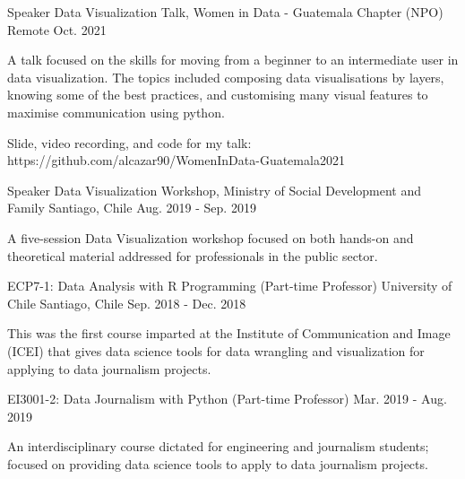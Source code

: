 

\begin{cventries}

  \cventry
    {Speaker} %
    {Data Visualization Talk, Women in Data - Guatemala Chapter (NPO)} %
    {Remote} %
    {Oct. 2021} %
    {
      \begin{cvitems} %
        \item {A talk focused on the skills for moving from a beginner to an intermediate user in data visualization. The topics included composing data visualisations by layers, knowing some of the best practices, and customising many visual features to maximise communication using python.}
        \item {Slide, video recording, and code for my talk: https://github.com/alcazar90/WomenInData-Guatemala2021}
      \end{cvitems}
    }
    
  \cventry
    {Speaker} %
    {Data Visualization Workshop, Ministry of Social Development and Family} %
    {Santiago, Chile} %
    {Aug. 2019 - Sep. 2019} %
    {
      \begin{cvitems} %
        \item {A five-session Data Visualization workshop focused on both hands-on and theoretical material addressed for professionals in the public sector.
}
      \end{cvitems}
    }
   
  \cventrytwopositions
    {ECP7-1: Data Analysis with R Programming (Part-time Professor)}
    {University of Chile}
    {Santiago, Chile}
    {Sep. 2018 - Dec. 2018}
    {
      \begin{cvitems}
        \item {This was the first course imparted at the Institute of Communication and Image (ICEI) that gives data science tools for data wrangling and visualization for applying to data journalism projects.}      
      \end{cvitems}
    }
    {EI3001-2: Data Journalism with Python (Part-time Professor)}
    {Mar. 2019 - Aug. 2019}
    {
      \begin{cvitems}
        \item {An interdisciplinary course dictated for engineering and journalism students; focused on providing data science tools to apply to data journalism projects.}
      \end{cvitems}
    }


\end{cventries}
